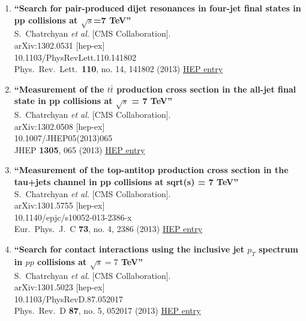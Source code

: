 \documentclass{article}
\begin{document}
\begin{enumerate}
\item%
{\bf ``Search for pair-produced dijet resonances in four-jet final states in pp collisions at $\sqrt{s}$=7  TeV''}
  \\{}S.~Chatrchyan {\it et al.} [CMS Collaboration].
  \\{}arXiv:1302.0531 [hep-ex]
    \\{}10.1103/PhysRevLett.110.141802
\\{}Phys.\ Rev.\ Lett.\  {\bf 110}, no. 14, 141802 (2013) %
\href{http://inspirehep.net/record/1217552}{HEP entry}


\item%
{\bf ``Measurement of the $t\bar{t}$ production cross section in the all-jet final state in pp collisions at $\sqrt{s}$ = 7 TeV''}
  \\{}S.~Chatrchyan {\it et al.} [CMS Collaboration].
  \\{}arXiv:1302.0508 [hep-ex]
    \\{}10.1007/JHEP05(2013)065
\\{}JHEP {\bf 1305}, 065 (2013) %
\href{http://inspirehep.net/record/1217551}{HEP entry}


\item%
{\bf ``Measurement of the top-antitop production cross section in the tau+jets channel in pp collisions at sqrt(s) = 7 TeV''}
  \\{}S.~Chatrchyan {\it et al.} [CMS Collaboration].
  \\{}arXiv:1301.5755 [hep-ex]
    \\{}10.1140/epjc/s10052-013-2386-x
\\{}Eur.\ Phys.\ J.\ C {\bf 73}, no. 4, 2386 (2013) %
\href{http://inspirehep.net/record/1216035}{HEP entry}


\item%
{\bf ``Search for contact interactions using the inclusive jet $p_T$ spectrum in $pp$ collisions at $\sqrt{s} = 7$ TeV''}
  \\{}S.~Chatrchyan {\it et al.} [CMS Collaboration].
  \\{}arXiv:1301.5023 [hep-ex]
    \\{}10.1103/PhysRevD.87.052017
\\{}Phys.\ Rev.\ D {\bf 87}, no. 5, 052017 (2013) %
\href{http://inspirehep.net/record/1215599}{HEP entry}



\end{enumerate}
\end{document}
